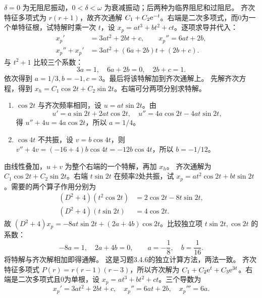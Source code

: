 $\delta=0$ 为无阻尼振动，$0<\delta<\omega$ 为衰减振动；后两种为临界阻尼和过阻尼。
齐次特征多项式为 $r(r+1)$，故齐次通解 $C_1+C_2\mathrm e^{-t}$。右端是二次多项式，而0为一个单特征根，试特解时乘一次 $t$，设 $x_p=at^3+bt^2+ct$。逐项求导并代入：
\[
\begin{aligned}
x_p'&=3at^2+2bt+c,\qquad x_p''=6at+2b,\\
x_p''+x_p'&=3at^2+(6a+2b)t+(2b+c).
\end{aligned}
\]
与 $t^2+1$ 比较三个系数：
\[
3a=1,\quad6a+2b=0,\quad2b+c=1.
\]
依次得到 $a=1/3,b=-1,c=3$。最后将该特解加到齐次通解上。
先解齐次方程，得到 $x_h=C_1\cos2t+C_2\sin2t$。右端可分两项分别求特解。
\begin{enumerate}
\item $\cos2t$ 与齐次频率相同，设 $u=at\sin2t$。由
\[
u'=a\sin2t+2at\cos2t,\quad
u''=4a\cos2t-4at\sin2t,
\]
得 $u''+4u=4a\cos2t$，所以 $a=1/4$。
\item $\cos4t$ 不共振，设 $v=b\cos4t$，则 $v''+4v=(-16+4)b\cos4t=-12b\cos4t$，所以 $b=-1/12$。
\end{enumerate}
由线性叠加，$u+v$ 为整个右端的一个特解，再加 $x_h$。
齐次通解为 $C_1\cos2t+C_2\sin2t$。右端 $t\sin2t$ 在频率2处共振，试 $x_p=at^2\cos2t+bt\sin2t$。需要的两个算子作用分别为
\[
\begin{aligned}
(D^2+4)(t^2\cos2t)&=2\cos2t-8t\sin2t,\\
(D^2+4)(t\sin2t)&=4\cos2t.
\end{aligned}
\]
故 $(D^2+4)x_p=-8at\sin2t+(2a+4b)\cos2t$。比较独立项 $t\sin2t,\cos2t$ 的系数：
\[
-8a=1,\quad2a+4b=0,
\qquad a=-\dfrac18,\quad b=\dfrac1{16}.
\]
将特解与齐次解相加即得通解。
这是习题3.4.6的独立计算方法，两法一致。
齐次特征多项式 $P(r)=r(r-1)(r-3)$，所以齐次解为 $C_1+C_2\mathrm e^t+C_3\mathrm e^{3t}$。右端是二次多项式且0为单根，设 $x_p=at^3+bt^2+ct$。三个导数为
\[
x_p'=3at^2+2bt+c,\quad x_p''=6at+2b,\quad x_p'''=6a.
\]
